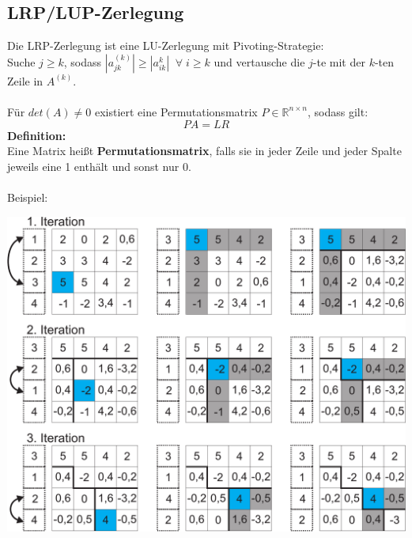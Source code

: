 \documentclass[a4paper,twocolumn,10pt]{article}
\begin{document}
\subsection{LRP/LUP-Zerlegung}
Die LRP-Zerlegung ist eine LU-Zerlegung mit Pivoting-Strategie:\\
Suche $j\geq k$, sodass $|a_{jk}^{(k)}|\geq |a_{ik}^{k}|\;\;\forall\; i\geq k$ und vertausche die $j$-te mit der $k$-ten Zeile in $A^{(k)}$.\\\\
Für $det(A)\neq 0$ existiert eine Permutationsmatrix $P\in\mathbb{R}^{n\times n}$, sodass gilt:
\begin{equation*}
PA=LR
\end{equation*}
\textbf{Definition:}\\
Eine Matrix heißt \textbf{Permutationsmatrix}, falls sie in jeder Zeile und jeder Spalte jeweils eine 1 enthält und sonst nur 0.\\\\
Beispiel:
\begin{center}
\includegraphics[width=0.95\columnwidth]{Grafiken/LUP-Zerlegung}
\end{center}
\end{document}
